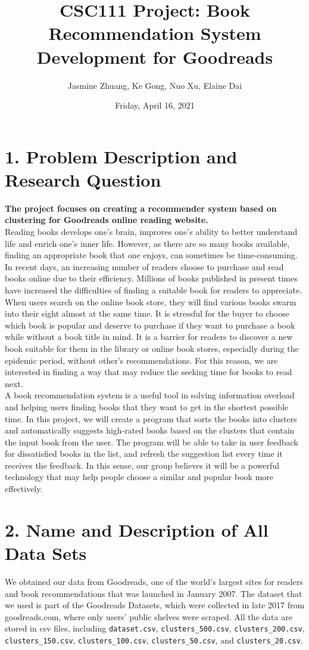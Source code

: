 \documentclass[fontsize=11pt]{article}
\title{CSC111 Project: Book Recommendation System Development for Goodreads}
\author{Jasmine Zhuang, Ke Gong, Nuo Xu, Elaine Dai}
\date{Friday, April 16, 2021}
\begin{document}
\maketitle

\section*{1. Problem Description and Research Question}
\qquad \textbf{The project focuses on creating a recommender system based on clustering for Goodreads online reading website.}\\

\qquad Reading books develops one's brain, improves one's ability to better understand life and enrich one's inner life. However, as there are so many books available, finding an appropriate book that one enjoys, can sometimes be time-consuming. In recent days, an increasing number of readers choose to purchase and read books online due to their efficiency. Millions of books published in present times have increased the difficulties of finding a suitable book for readers to appreciate. When users search on the online book store, they will find various books swarm into their sight almost at the same time. It is stressful for the buyer to choose which book is popular and deserve to purchase if they want to purchase a book while without a book title in mind. It is a barrier for readers to discover a new book suitable for them in the library or online book stores, especially during the epidemic period, without other’s recommendations. For this reason, we are interested in finding a way that may reduce the seeking time for books to read next. \\

\qquad A book recommendation system is a useful tool in solving information overload and helping users finding books that they want to get in the shortest possible time. In this project, we will create a program that sorts the books into clusters and automatically suggests high-rated books based on the clusters that contain the input book from the user. The program will be able to take in user feedback for dissatisfied books in the list, and refresh the suggestion list every time it receives the feedback. In this sense, our group believes it will be a powerful technology that may help people choose a similar and popular book more effectively.


\section*{2. Name and Description of All Data Sets }
\qquad We obtained our data from Goodreads, one of the world’s largest sites for readers and book recommendations that was launched in January 2007. The dataset that we used is part of the Goodreads Datasets, which were collected in late 2017 from goodreads.com, where only users' public shelves were scraped. All the data are stored in csv files, including \texttt{dataset.csv}, \texttt{clusters\_500.csv}, \texttt{clusters\_200.csv}, \texttt{clusters\_150.csv}, \texttt{clusters\_100.csv}, \texttt{clusters\_50.csv}, and \texttt{clusters\_20.csv}. \\
\end{document}
